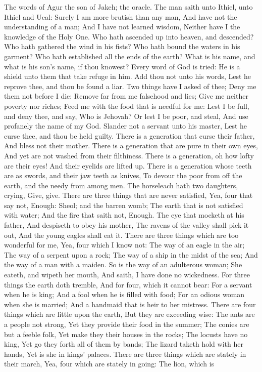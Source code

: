 The words of Agur the son of Jakeh; the oracle. The man saith unto Ithiel, unto Ithiel and Ucal:  Surely I am more brutish than any man, And have not the understanding of a man;  And I have not learned wisdom, Neither have I the knowledge of the Holy One.  Who hath ascended up into heaven, and descended? Who hath gathered the wind in his fists? Who hath bound the waters in his garment? Who hath established all the ends of the earth? What is his name, and what is his son’s name, if thou knowest?  Every word of God is tried: He is a shield unto them that take refuge in him.  Add thou not unto his words, Lest he reprove thee, and thou be found a liar.  Two things have I asked of thee; Deny me them not before I die:  Remove far from me falsehood and lies; Give me neither poverty nor riches; Feed me with the food that is needful for me:  Lest I be full, and deny thee, and say, Who is Jehovah? Or lest I be poor, and steal, And use profanely the name of my God.  Slander not a servant unto his master, Lest he curse thee, and thou be held guilty.  There is a generation that curse their father, And bless not their mother.  There is a generation that are pure in their own eyes, And yet are not washed from their filthiness.  There is a generation, oh how lofty are their eyes! And their eyelids are lifted up.  There is a generation whose teeth are as swords, and their jaw teeth as knives, To devour the poor from off the earth, and the needy from among men.  The horseleach hath two daughters, crying, Give, give. There are three things that are never satisfied, Yea, four that say not, Enough:  Sheol; and the barren womb; The earth that is not satisfied with water; And the fire that saith not, Enough.  The eye that mocketh at his father, And despiseth to obey his mother, The ravens of the valley shall pick it out, And the young eagles shall eat it.  There are three things which are too wonderful for me, Yea, four which I know not:  The way of an eagle in the air; The way of a serpent upon a rock; The way of a ship in the midst of the sea; And the way of a man with a maiden.  So is the way of an adulterous woman; She eateth, and wipeth her mouth, And saith, I have done no wickedness.  For three things the earth doth tremble, And for four, which it cannot bear:  For a servant when he is king; And a fool when he is filled with food;  For an odious woman when she is married; And a handmaid that is heir to her mistress.  There are four things which are little upon the earth, But they are exceeding wise:  The ants are a people not strong, Yet they provide their food in the summer;  The conies are but a feeble folk, Yet make they their houses in the rocks;  The locusts have no king, Yet go they forth all of them by bands;  The lizard taketh hold with her hands, Yet is she in kings’ palaces.  There are three things which are stately in their march, Yea, four which are stately in going:  The lion, which is 